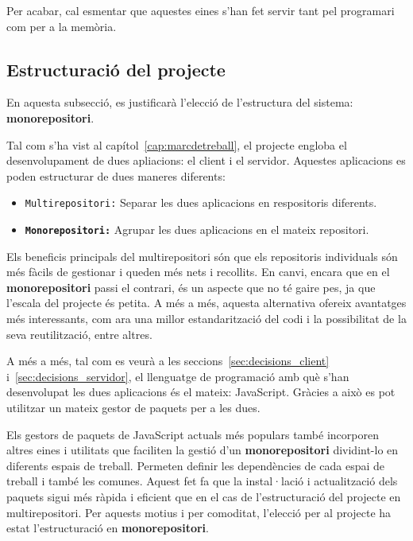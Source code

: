 \documentclass[a4paper,12pt]{ThesisStyle}
\begin{document}
Per acabar, cal esmentar que aquestes eines s'han fet servir tant pel programari com per a la memòria.

\subsection{Estructuració del projecte}
\label{subsec:decisions_estructura_estructura}

En aquesta subsecció, es justificarà l'elecció de l'estructura del sistema: \textbf{monorepositori}.

Tal com s'ha vist al capítol~\ref{cap:marcdetreball}, el projecte engloba el desenvolupament de dues apliacions: el client i el servidor. Aquestes aplicacions es poden estructurar de dues maneres diferents:
\begin{itemize}
  \item \texttt{Multirepositori:} Separar les dues aplicacions en respositoris diferents. 
  \item \texttt{\textbf{Monorepositori:}} Agrupar les dues aplicacions en el mateix repositori.
\end{itemize}

Els beneficis principals del multirepositori són que els repositoris individuals són més fàcils de gestionar i queden més nets i recollits. En canvi, encara que en el \textbf{monorepositori} passi el contrari, és un aspecte que no té gaire pes, ja que l'escala del projecte és petita. A més a més, aquesta alternativa ofereix avantatges més interessants, com ara una millor estandarització del codi i la possibilitat de la seva reutilització, entre altres.

A més a més, tal com es veurà a les seccions~\ref{sec:decisions_client} i~\ref{sec:decisions_servidor}, el llenguatge de programació amb què s'han desenvolupat les dues aplicacions és el mateix: JavaScript. Gràcies a això es pot utilitzar un mateix gestor de paquets per a les dues.

Els gestors de paquets de JavaScript actuals més populars també incorporen altres eines i utilitats que faciliten la gestió d'un \textbf{monorepositori} dividint-lo en diferents espais de treball. Permeten definir les dependències de cada espai de treball i també les comunes. Aquest fet fa que la instal·lació i actualització dels paquets sigui més ràpida i eficient que en el cas de l'estructuració del projecte en multirepositori. Per aquests motius i per comoditat, l'elecció per al projecte ha estat l'estructuració en \textbf{monorepositori}.
\end{document}
